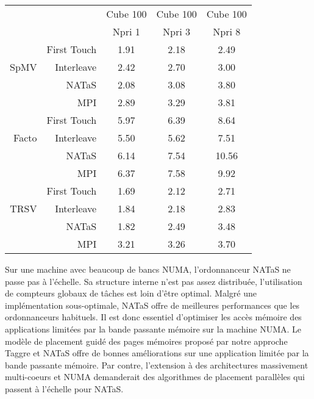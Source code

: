 \begin{center}
  \begin{tabular}{|r|r|c|c|c|}
    \hline
       & & Cube 100 & Cube 100 & Cube 100 \\
       & & Npri 1   & Npri 3   & Npri 8 \\
    \hline
&        First Touch & 1.91 & 2.18 & 2.49 \\
SpMV &   Interleave  & 2.42 & 2.70 & 3.00 \\
&        NATaS       & 2.08 & 3.08 & 3.80 \\
&        MPI         & 2.89 & 3.29 & 3.81 \\
    \hline
&        First Touch & 5.97 & 6.39 & 8.64 \\
Facto &  Interleave  & 5.50 & 5.62 & 7.51 \\
&        NATaS       & 6.14 & 7.54 & 10.56 \\
&        MPI         & 6.37 & 7.58 & 9.92 \\
    \hline
&        First Touch & 1.69 & 2.12 & 2.71 \\
TRSV &   Interleave  & 1.84 & 2.18 & 2.83 \\
&        NATaS       & 1.82 & 2.49 & 3.48 \\
&        MPI         & 3.21 & 3.26 & 3.70 \\
    \hline
  \end{tabular}
  \label{tab:rostand_sum}
\end{center}

Sur une machine avec beaucoup de bancs NUMA, l'ordonnanceur NATaS ne passe pas à l'échelle.
%
Sa structure interne n'est pas assez distribuée, l'utilisation de compteurs globaux de tâches est loin d'être optimal.
%
Malgré une implémentation sous-optimale, NATaS offre de meilleures performances que les ordonnanceurs habituels.
%
Il est donc essentiel d'optimiser les accès mémoire des applications limitées par la bande passante mémoire sur la machine NUMA.
%
Le modèle de placement guidé des pages mémoires proposé par notre approche Taggre et NATaS offre de bonnes améliorations sur une application limitée par la bande passante mémoire.
%
Par contre, l'extension à des architectures massivement multi-coeurs et NUMA demanderait des algorithmes de placement parallèles qui passent à l'échelle pour NATaS.

